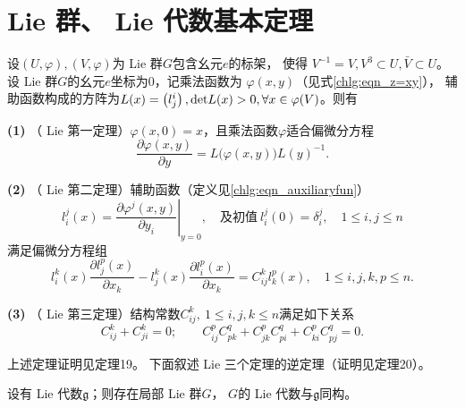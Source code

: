 \section{ Lie 群、 Lie 代数基本定理}\label{chlg:sec_Lie3thm}


\begin{theorem}
    设$(U, \varphi),(V, \varphi)$为 Lie 群$G$包含幺元$e$的标架，
    使得 $V^{-1}=V, V^3 \subset U, \bar{V} \subset U$。
    设 Lie 群$G$的幺元$e$坐标为$0$，记乘法函数为 $\varphi(x, y)$（见式\eqref{chlg:eqn_z=xy}），
    辅助函数构成的方阵为$L(x)=\left(l_j^i\right), {\rm det} L(x)>0,
    \forall x \in \varphi(V)$。则有
    
    \noindent  
    {\bfseries (1)} （ Lie 第一定理）$\varphi(x, 0)=x$，且乘法函数$\varphi$适合偏微分方程
    \begin{equation}
        \frac{\partial \varphi(x, y)}{\partial y}=L\bigl(\varphi(x, y)\bigr) L(y)^{-1} .
    \end{equation}
    
    \noindent  
    {\bfseries (2)} （ Lie 第二定理）辅助函数（定义见\eqref{chlg:eqn_auxiliaryfun}）
    \begin{equation}
        l_i^j(x)=\left.\frac{\partial \varphi^j(x, y)}{\partial y_i}\right|_{y=0},
        \quad \text{及初值}\ l_i^j(0)=\delta_i^j,
        \quad 1 \leqslant i, j \leqslant n
    \end{equation}
    满足偏微分方程组
    \begin{equation}
        l_i^k(x) \frac{\partial l_j^p(x)}{\partial x_k}-l_j^k(x)
        \frac{\partial l_i^p(x)}{\partial x_k}= C_{i j}^k l_k^p(x),
        \quad 1 \leqslant i, j,k, p \leqslant n .
    \end{equation}
    
    \noindent  
    {\bfseries (3)} （ Lie 第三定理）结构常数$C_{i j}^k,\ 1 \leqslant i, j, k \leqslant n$满足如下关系
    \begin{equation}\label{chlg:eqn_LC-Jacobi}
        C_{i j}^k+C_{j i}^k=0; \qquad
        C_{i j}^p C_{p k}^q +C_{j k}^p C_{p i}^q +C_{k i}^p C_{p j}^q=0 .
    \end{equation}
    
\end{theorem}

上述定理证明见\parencite[\S 3.7]{huangxg-2024}定理19。
下面叙述 Lie 三个定理的逆定理（证明见\parencite[\S 3.7]{huangxg-2024}定理20）。

\begin{theorem}\label{chlg:thm_Lie3inv}
    设有 Lie 代数$\mathfrak{g}$；则存在局部 Lie 群$G$，
    $G$的 Lie 代数与$\mathfrak{g}$同构。
\end{theorem}

